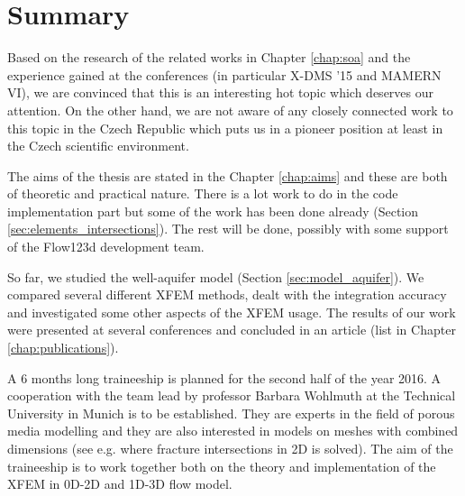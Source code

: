 \documentclass[FM,Dis]{tulthesis}
\begin{document}

\chapter{Summary} \label{chap:summary}

Based on the research of the related works in Chapter \ref{chap:soa} and the experience gained at the conferences
(in particular X-DMS '15 and MAMERN VI), we are convinced that this is an interesting hot topic which deserves
our attention. On the other hand, we are not aware of any closely connected work to this topic in the Czech Republic
which puts us in a pioneer position at least in the Czech scientific environment.

The aims of the thesis are stated in the Chapter \ref{chap:aims} and these are both of theoretic and practical nature.
There is a lot work to do in the code implementation part but some of the work has been done already 
(Section \ref{sec:elements_intersections}). The rest will be done, possibly with some support of the Flow123d development team. 

So far, we studied the well-aquifer model (Section \ref{sec:model_aquifer}). We compared several different XFEM methods, 
dealt with the integration accuracy and investigated some other aspects of the XFEM usage. The results
of our work were presented at several conferences and concluded in an article (list in Chapter \ref{chap:publications}).

A 6 months long traineeship is planned for the second half of the year 2016. A cooperation with the team lead
by professor Barbara Wohlmuth at the Technical University in Munich is to be established. They are experts
in the field of porous media modelling and they are also interested in models on meshes with combined dimensions
(see e.g. \cite{schwenck_2015} where fracture intersections in 2D is solved). The aim of the traineeship is to
work together both on the theory and implementation of the XFEM in 0D-2D and 1D-3D flow model.



 
%

\end{document}
